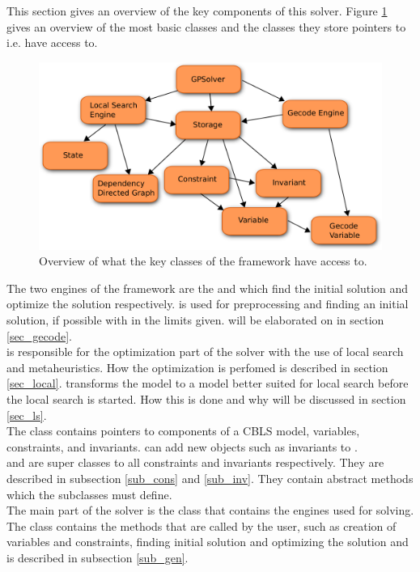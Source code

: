 This section gives an overview of the key components of this solver. Figure \ref{fig_architec} gives an overview 
of the most basic classes and the classes they store pointers to i.e. have access to. 
\begin{figure}[!b]
\includegraphics[width=\linewidth]{architectureTest}\caption{Overview of what the key classes of the framework have 
access to.} 
\label{fig_architec}
\end{figure} \noindent
The two engines of the framework are the \gecodesol and \lssol which find the initial solution and optimize the 
solution respectively. \gecodesol is used for preprocessing and finding an initial solution, if possible with in the 
limits given. \gecodesol will be elaborated on in section \ref{sec_gecode}. \\
\lssol is responsible for the optimization part of the solver with the use of local search and 
metaheuristics. How the optimization is perfomed is described in section \ref{sec_local}. \lssol 
transforms the model to a model better suited for local search before the local search is started. How this is done and 
why will be discussed in section \ref{sec_ls}. \\ 
The  class contains pointers to components of a CBLS model, variables, constraints, and invariants. 
\lssol can add new objects such as invariants to . \\ 
 and  are super classes to all constraints and invariants respectively. They are 
described in subsection \ref{sub_cons} and \ref{sub_inv}. They contain abstract methods which the subclasses must 
define. \\ 
The main part of the solver is the  class that contains the engines used for solving.
The  class contains the methods that are called by the user, such as creation of variables and 
constraints, finding initial solution and optimizing the solution and is described in subsection \ref{sub_gen}. 

